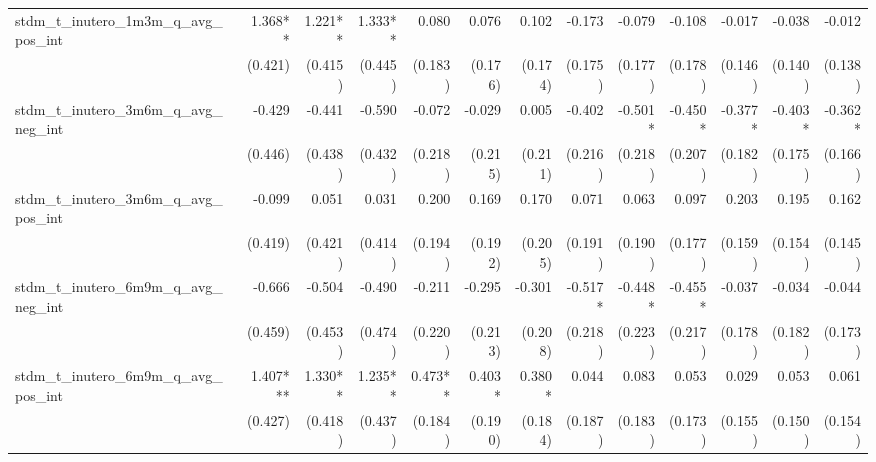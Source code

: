 \begin{tabular}{lrrrrrrrrrrrr}
stdm\_t\_inutero\_1m3m\_q\_avg\_pos\_int    &      1.368** &      1.221** &      1.333** &        0.080 &        0.076 &        0.102 &       -0.173 &       -0.079 &       -0.108 &       -0.017 &       -0.038 &       -0.012 \\ 
                                            &      (0.421) &      (0.415) &      (0.445) &      (0.183) &      (0.176) &      (0.174) &      (0.175) &      (0.177) &      (0.178) &      (0.146) &      (0.140) &      (0.138) \\ 
stdm\_t\_inutero\_3m6m\_q\_avg\_neg\_int    &       -0.429 &       -0.441 &       -0.590 &       -0.072 &       -0.029 &        0.005 &       -0.402 &      -0.501* &      -0.450* &      -0.377* &      -0.403* &      -0.362* \\ 
                                            &      (0.446) &      (0.438) &      (0.432) &      (0.218) &      (0.215) &      (0.211) &      (0.216) &      (0.218) &      (0.207) &      (0.182) &      (0.175) &      (0.166) \\ 
stdm\_t\_inutero\_3m6m\_q\_avg\_pos\_int    &       -0.099 &        0.051 &        0.031 &        0.200 &        0.169 &        0.170 &        0.071 &        0.063 &        0.097 &        0.203 &        0.195 &        0.162 \\ 
                                            &      (0.419) &      (0.421) &      (0.414) &      (0.194) &      (0.192) &      (0.205) &      (0.191) &      (0.190) &      (0.177) &      (0.159) &      (0.154) &      (0.145) \\ 
stdm\_t\_inutero\_6m9m\_q\_avg\_neg\_int    &       -0.666 &       -0.504 &       -0.490 &       -0.211 &       -0.295 &       -0.301 &      -0.517* &      -0.448* &      -0.455* &       -0.037 &       -0.034 &       -0.044 \\ 
                                            &      (0.459) &      (0.453) &      (0.474) &      (0.220) &      (0.213) &      (0.208) &      (0.218) &      (0.223) &      (0.217) &      (0.178) &      (0.182) &      (0.173) \\ 
stdm\_t\_inutero\_6m9m\_q\_avg\_pos\_int    &     1.407*** &      1.330** &      1.235** &      0.473** &       0.403* &       0.380* &        0.044 &        0.083 &        0.053 &        0.029 &        0.053 &        0.061 \\ 
                                            &      (0.427) &      (0.418) &      (0.437) &      (0.184) &      (0.190) &      (0.184) &      (0.187) &      (0.183) &      (0.173) &      (0.155) &      (0.150) &      (0.154) \\ 

\end{tabular}

